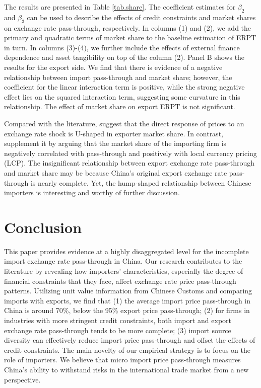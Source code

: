 \documentclass[12pt]{article}
\begin{document}
The results are presented in Table \ref{tab.share}. The coefficient estimates for $\beta_2$ and $\beta_3$ can be used to describe the effects of credit constraints and market shares on exchange rate pass-through, respectively. In columns (1) and (2), we add the primary and quadratic terms of market share to the baseline estimation of ERPT in turn. In columns (3)-(4), we further include the effects of external finance dependence and asset tangibility on top of the column (2). Panel B shows the results for the export side. We find that there is evidence of a negative relationship between import pass-through and market share; however, the coefficient for the linear interaction term is positive, while the strong negative effect lies on the squared interaction term, suggesting some curvature in this relationship. The effect of market share on export ERPT is not significant. 

Compared with the literature, \cite{auer2016} suggest that the direct response of prices to an exchange rate shock is U-shaped in exporter market share. In contrast, \cite{devereux2017} supplement it by arguing that the market share of the importing firm is negatively correlated with pass-through and positively with local currency pricing (LCP). The insignificant relationship between export exchange rate pass-through and market share may be because China's original export exchange rate pass-through is nearly complete. Yet, the hump-shaped relationship between Chinese importers is interesting and worthy of further discussion.

\section{Conclusion}\label{Conclusion}

This paper provides evidence at a highly disaggregated level for the incomplete import exchange rate pass-through in China. Our research contributes to the literature by revealing how importers' characteristics, especially the degree of financial constraints that they face, affect exchange rate price pass-through patterns. Utilizing unit value information from Chinese Customs and comparing imports with exports, we find that (1) the average import price pass-through in China is around 70\%, below the 95\% export price pass-through; (2) for firms in industries with more stringent credit constraints, both import and export exchange rate pass-through tends to be more complete; (3) import source diversity can effectively reduce import price pass-through and offset the effects of credit constraints. The main novelty of our empirical strategy is to focus on the role of importers. We believe that micro import price pass-through measures China's ability to withstand risks in the international trade market from a new perspective.
\end{document}
